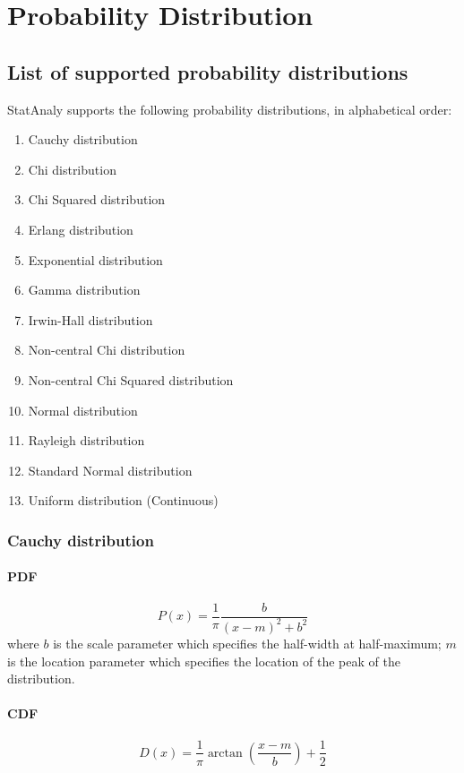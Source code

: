 \chapter{Probability Distribution}
\label{ch:prob_distr}

\section{List of supported probability distributions}
StatAnaly supports the following probability distributions, in alphabetical order:

\begin{enumerate}
    \item Cauchy distribution
    \item Chi distribution
    \item Chi Squared distribution
    \item Erlang distribution
    \item Exponential distribution
    \item Gamma distribution
    \item Irwin-Hall distribution
    \item Non-central Chi distribution
    \item Non-central Chi Squared distribution
    \item Normal distribution
    \item Rayleigh distribution
    \item Standard Normal distribution
    \item Uniform distribution (Continuous)
\end{enumerate}


\subsection{Cauchy distribution}

\subsubsection*{PDF}
\[
    P(x) = \frac{1}{\pi} \frac{b}{(x-m)^2 + b^2}
\]
where $b$ is the scale parameter which specifies the half-width at half-maximum; 
$m$ is the location parameter which specifies the location of the peak of the distribution.

\subsubsection*{CDF}
\[
    D(x) = \frac{1}{\pi} \arctan{(\frac{x-m}{b})} + \frac{1}{2}
\]

